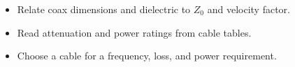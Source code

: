 \begin{objectives}
\begin{itemize}[leftmargin=1.4em,itemsep=2pt]
\item Relate coax dimensions and dielectric to $Z_0$ and velocity factor.
\item Read attenuation and power ratings from cable tables.
\item Choose a cable for a frequency, loss, and power requirement.
\end{itemize}
\end{objectives}

